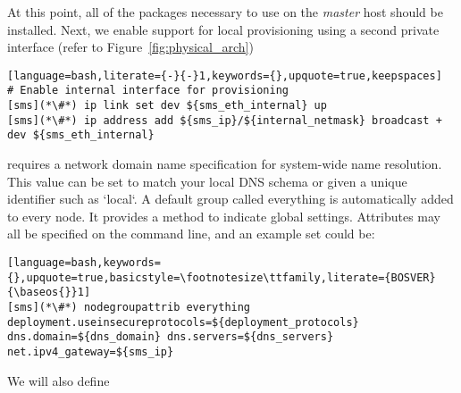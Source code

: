At this point, all of the packages necessary to use \Confluent{} on the {\em master}
host should be installed. Next, we enable support for local provisioning using
a second private interface (refer to Figure~\ref{fig:physical_arch})

\begin{lstlisting}[language=bash,literate={-}{-}1,keywords={},upquote=true,keepspaces]
# Enable internal interface for provisioning
[sms](*\#*) ip link set dev ${sms_eth_internal} up
[sms](*\#*) ip address add ${sms_ip}/${internal_netmask} broadcast + dev ${sms_eth_internal}

\end{lstlisting}


\noindent \Confluent{} requires a network domain name specification for system-wide name
resolution. This value can be set to match your local DNS schema or given a
unique identifier such as `local`. A default group called everything is 
automatically added to every node. It provides a method to indicate global settings.
Attributes may all be specified on the command line, and an example set could be:

\begin{lstlisting}[language=bash,keywords={},upquote=true,basicstyle=\footnotesize\ttfamily,literate={BOSVER}{\baseos{}}1]
[sms](*\#*) nodegroupattrib everything deployment.useinsecureprotocols=${deployment_protocols} dns.domain=${dns_domain} dns.servers=${dns_servers} net.ipv4_gateway=${sms_ip}
\end{lstlisting}

\noindent We will also define 
